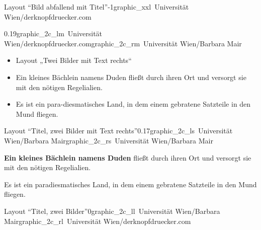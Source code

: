 \documentclass[hyperref={pdfpagelabels=false}, aspectratio=43, t]{beamer}  %
\begin{document}
\begin{graphicsFrame}{Layout ``Bild abfallend mit Titel''}{}{-1}{}{graphic_xxl}{\textcopyright~Universität Wien/derknopfdruecker.com}

\end{graphicsFrame}

\begin{graphicsFrame2}{}{0.19}{graphic_2c_lm}{\textcopyright~Universität Wien/derknopfdruecker.com}{graphic_2c_rm}{\textcopyright~Universität Wien/Barbara Mair}

		\begin{itemize}
			\item Layout „Twei Bilder mit Text rechts“ 
			\item Ein kleines Bächlein namens Duden fließt durch ihren Ort und versorgt sie mit den nötigen Regelialien.
			\item Es ist ein para-diesmatisches Land, in dem einem gebratene Satzteile in den Mund fliegen.
		\end{itemize}

\end{graphicsFrame2}

\begin{graphicsFrame2}{Layout ``Titel, zwei Bilder mit Text rechts''}{0.17}{graphic_2c_ls}{\textcopyright~Universität Wien/Barbara Mair}{graphic_2c_rs}{\textcopyright~Universität Wien/Barbara Mair}

	\textbf{Ein kleines Bächlein namens Duden} fließt durch ihren Ort und versorgt sie mit den nötigen Regelialien.
	\smallskip

	Es ist ein paradiesmatisches Land, in dem einem gebratene Satzteile in den Mund fliegen.

\end{graphicsFrame2}

\begin{graphicsFrame2}{Layout ``Titel, zwei Bilder''}{0}{graphic_2c_ll}{\textcopyright~Universität Wien/Barbara Mair}{graphic_2c_rl}{\textcopyright~Universität Wien/derknopfdruecker.com}

\end{graphicsFrame2}


\end{document}
